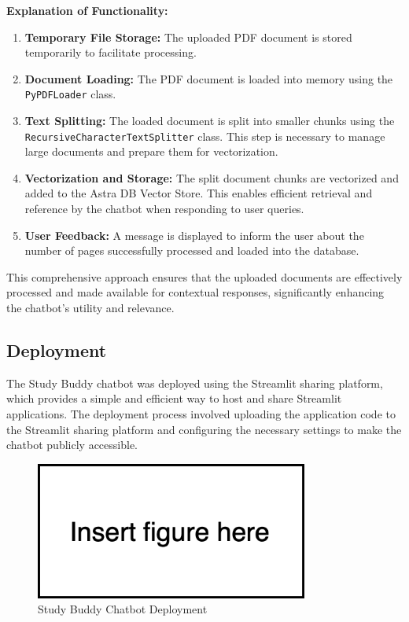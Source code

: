 \textbf{Explanation of Functionality:}
\begin{enumerate}
    \item \textbf{Temporary File Storage:} The uploaded PDF document is stored temporarily to facilitate processing.
    \item \textbf{Document Loading:} The PDF document is loaded into memory using the \texttt{PyPDFLoader} class.
    \item \textbf{Text Splitting:} The loaded document is split into smaller chunks using the \texttt{RecursiveCharacterTextSplitter} class. This step is necessary to manage large documents and prepare them for vectorization.
    \item \textbf{Vectorization and Storage:} The split document chunks are vectorized and added to the Astra DB Vector Store. This enables efficient retrieval and reference by the chatbot when responding to user queries.
    \item \textbf{User Feedback:} A message is displayed to inform the user about the number of pages successfully processed and loaded into the database.
\end{enumerate}

This comprehensive approach ensures that the uploaded documents are effectively processed and made available for contextual responses, significantly enhancing the chatbot's utility and relevance.

\subsection{Deployment}
The Study Buddy chatbot was deployed using the Streamlit sharing platform, which provides a simple and efficient way to host and share Streamlit applications. The deployment process involved uploading the application code to the Streamlit sharing platform and configuring the necessary settings to make the chatbot publicly accessible.
\begin{figure}[H]
    \centering
    \includegraphics[width=0.8\textwidth]{figs/insert.png}
    \caption{Study Buddy Chatbot Deployment}
    \label{fig:deployment}
\end{figure}


